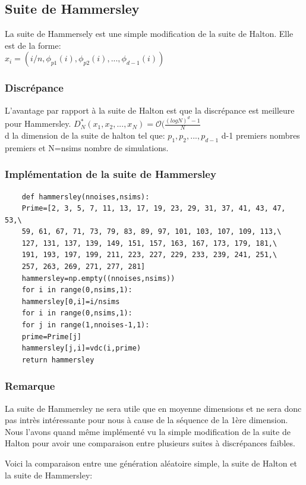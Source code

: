 \documentclass[12pt]{report}
\begin{document}
\subsection{Suite de Hammersley}
La suite de Hammersely est une simple modification de la suite de Halton. Elle est de la forme:\\
$x_i=(i/n,\phi_{p1}(i),\phi_{p2}(i),...,\phi_{d-1}(i))$


\subsubsection{Discrépance}
L'avantage par rapport à la suite de Halton est que la discrépance est meilleure pour Hammersley.
$D_N^*(x_1,x_2,...,x_N)=\mathcal{O}(\frac{(logN)^d-1}{N} $\\
d la dimension de la suite de halton tel que: $p_1,p_2,...,p_{d-1}$ d-1 premiers nombres premiers et N=nsims nombre de simulations.

\subsubsection{Implémentation de la suite de Hammersley}
\begin{lstlisting}
	def hammersley(nnoises,nsims):
	Prime=[2, 3, 5, 7, 11, 13, 17, 19, 23, 29, 31, 37, 41, 43, 47, 53,\
	59, 61, 67, 71, 73, 79, 83, 89, 97, 101, 103, 107, 109, 113,\
	127, 131, 137, 139, 149, 151, 157, 163, 167, 173, 179, 181,\
	191, 193, 197, 199, 211, 223, 227, 229, 233, 239, 241, 251,\
	257, 263, 269, 271, 277, 281]
	hammersley=np.empty((nnoises,nsims))
	for i in range(0,nsims,1):
	hammersley[0,i]=i/nsims
	for i in range(0,nsims,1):
	for j in range(1,nnoises-1,1):
	prime=Prime[j]
	hammersley[j,i]=vdc(i,prime)
	return hammersley
\end{lstlisting}
\newpage
\subsubsection{Remarque}
La suite de Hammersley ne sera utile que en moyenne dimensions et ne sera donc pas intrès intéressante pour nous à cause de la séquence de la 1ère dimension.\\
Nous l'avons quand même implémenté vu la simple modification de la suite de Halton pour avoir une comparaison entre plusieurs suites à discrépances faibles.

Voici la comparaison entre une génération aléatoire simple, la suite de Halton et la suite de Hammersley:\\\\
\end{document}

